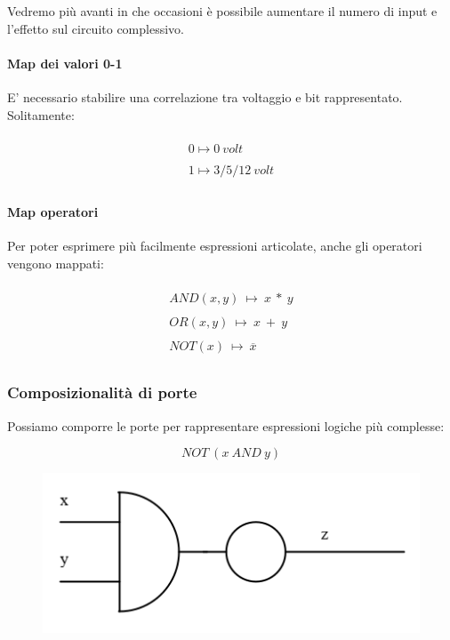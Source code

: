 \documentclass{article}
\begin{document}
Vedremo più avanti in che occasioni è possibile aumentare il numero di input e l'effetto sul circuito complessivo.

\paragraph{Map dei valori 0-1} E' necessario stabilire una correlazione tra voltaggio e bit rappresentato. Solitamente:

\begin{multline}
    \\ 0 \mapsto 0 \: volt \\
    \\ 1 \mapsto 3/5/12 \: volt \\
\end{multline}

\newpage

\vspace*{25px}

\paragraph{Map operatori} Per poter esprimere più facilmente espressioni articolate, anche gli operatori vengono mappati:

\begin{multline}
    \\ AND(x,y) \: \mapsto \: x \: * \: y \\
    \\ OR(x,y) \: \mapsto \: x \: + \: y \\
    \\ NOT(x) \: \mapsto \: \overline{x} \\
\end{multline}

\vspace*{50px}

\subsubsection{Composizionalità di porte}

Possiamo comporre le porte per rappresentare espressioni logiche più complesse:

\begin{equation}
    NOT \: (x \: AND \: y)
\end{equation}

    \begin{figure}[htbp]
        \center
        \includegraphics[scale=0.45]{img/exp1.png}
    \end{figure}
\end{document}
